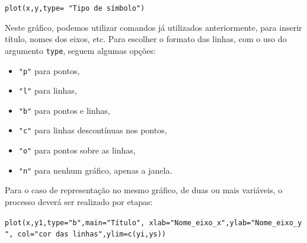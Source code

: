 \documentclass[12pt,brazil,oneside]{book}
\newenvironment{Shaded}{\begin{snugshade}}{\end{snugshade}}
\newcommand{\DataTypeTok}[1]{\textcolor[rgb]{0.13,0.29,0.53}{#1}}
\newcommand{\DecValTok}[1]{\textcolor[rgb]{0.00,0.00,0.81}{#1}}
\newcommand{\KeywordTok}[1]{\textcolor[rgb]{0.13,0.29,0.53}{\textbf{#1}}}
\newcommand{\NormalTok}[1]{#1}
\newcommand{\OperatorTok}[1]{\textcolor[rgb]{0.81,0.36,0.00}{\textbf{#1}}}
\newcommand{\StringTok}[1]{\textcolor[rgb]{0.31,0.60,0.02}{#1}}
\providecommand{\tightlist}{%
  \setlength{\itemsep}{0pt}\setlength{\parskip}{0pt}}
\begin{document}
\texttt{plot(x,y,type=\ "Tipo\ de\ símbolo")}

Neste gráfico, podemos utilizar comandos já utilizados anteriormente, para inserir título, nomes dos eixos, etc. Para escolher o formato das linhas, com o uso do argumento \texttt{type}, seguem algumas opções:

\begin{itemize}
\tightlist
\item
  \texttt{"p"} para pontos,
\item
  \texttt{"l"} para linhas,
\item
  \texttt{"b"} para pontos e linhas,
\item
  \texttt{"c"} para linhas descontínuas nos pontos,
\item
  \texttt{"o"} para pontos sobre as linhas,
\item
  \texttt{"n"} para nenhum gráfico, apenas a janela.
\end{itemize}

Para o caso de representação no mesmo gráfico, de duas ou mais variáveis, o processo deverá ser realizado por etapas:

\texttt{plot(x,y1,type="b",main="Título",\ xlab="Nome\_eixo\_x",ylab="Nome\_eixo\_y",\ col="cor\ das\ linhas",ylim=c(yi,ys))}

\begin{Shaded}
\end{Shaded}
\end{document}
